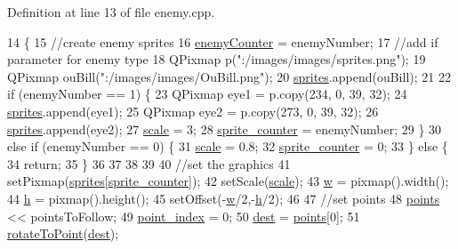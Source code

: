 Definition at line 13 of file enemy.\+cpp.


\begin{DoxyCode}
14 \{
15     \textcolor{comment}{//create enemy sprites}
16     \hyperlink{class_enemy_a5e1ff7cda54fcc5ae02925b0ecdbe1bc}{enemyCounter} = enemyNumber;
17     \textcolor{comment}{//add if parameter for enemy type}
18     QPixmap p(\textcolor{stringliteral}{":/images/images/sprites.png"});
19     QPixmap ouBill(\textcolor{stringliteral}{":/images/images/OuBill.png"});
20     \hyperlink{class_enemy_ae65aa5ab482bb5eae5c0329c821e5827}{sprites}.append(ouBill);
21 
22     \textcolor{keywordflow}{if} (enemyNumber == 1) \{
23         QPixmap eye1 = p.copy(234, 0, 39, 32);
24         \hyperlink{class_enemy_ae65aa5ab482bb5eae5c0329c821e5827}{sprites}.append(eye1);
25         QPixmap eye2 = p.copy(273, 0, 39, 32);
26         \hyperlink{class_enemy_ae65aa5ab482bb5eae5c0329c821e5827}{sprites}.append(eye2);
27         \hyperlink{class_enemy_a5c11ea6afd7998cf74a6a73dc05d0a63}{scale} = 3;
28         \hyperlink{class_enemy_ad36955113c7ac1218b7435d7a87cb846}{sprite\_counter} = enemyNumber;
29     \}
30     \textcolor{keywordflow}{else} \textcolor{keywordflow}{if} (enemyNumber == 0) \{
31         \hyperlink{class_enemy_a5c11ea6afd7998cf74a6a73dc05d0a63}{scale} = 0.8;
32         \hyperlink{class_enemy_ad36955113c7ac1218b7435d7a87cb846}{sprite\_counter} = 0;
33     \} \textcolor{keywordflow}{else} \{
34         \textcolor{keywordflow}{return};
35     \}
36 
37 
38 
39 
40     \textcolor{comment}{//set the graphics}
41     setPixmap(\hyperlink{class_enemy_ae65aa5ab482bb5eae5c0329c821e5827}{sprites}[\hyperlink{class_enemy_ad36955113c7ac1218b7435d7a87cb846}{sprite\_counter}]);
42     setScale(\hyperlink{class_enemy_a5c11ea6afd7998cf74a6a73dc05d0a63}{scale});
43     \hyperlink{class_enemy_a259bfaab0f0d06c9ec2cb15c787e0b3a}{w} = pixmap().width();
44     \hyperlink{class_enemy_adcb5512e63e735485cbb83f763acce75}{h} = pixmap().height();
45     setOffset(-\hyperlink{class_enemy_a259bfaab0f0d06c9ec2cb15c787e0b3a}{w}/2,-\hyperlink{class_enemy_adcb5512e63e735485cbb83f763acce75}{h}/2);
46 
47     \textcolor{comment}{//set points}
48     \hyperlink{class_enemy_ae8af9f207c5285b56f7cb190c66994c8}{points} << pointsToFollow;
49     \hyperlink{class_enemy_a7291ad5563a976b78fbf6731b353f1c9}{point\_index} = 0;
50     \hyperlink{class_enemy_a50c844f66858b84fc8ebdfccf7e2c535}{dest} = \hyperlink{class_enemy_ae8af9f207c5285b56f7cb190c66994c8}{points}[0];
51     \hyperlink{class_enemy_aed33c099d6ec54e1c6cfb676ac38de5b}{rotateToPoint}(\hyperlink{class_enemy_a50c844f66858b84fc8ebdfccf7e2c535}{dest});

\end{DoxyCode}
